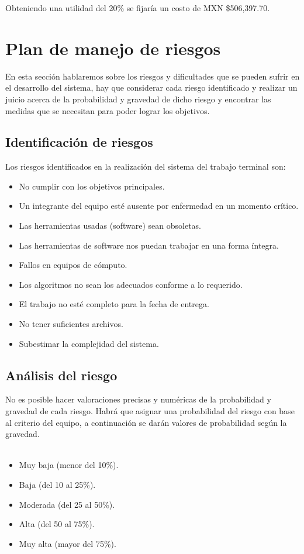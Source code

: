 \documentclass[12pt]{report}
\begin{document}
Obteniendo una utilidad del 20\% se fijaría un costo de MXN \$506,397.70.


\section{Plan de manejo de riesgos}
En esta sección hablaremos sobre los riesgos y dificultades que se pueden sufrir en el desarrollo del sistema, hay que considerar cada riesgo identificado y realizar un juicio acerca de la probabilidad y gravedad de dicho riesgo y encontrar las medidas que se necesitan para poder lograr los objetivos.\\

\subsection{Identificación de riesgos}
Los riesgos identificados en la realización del sistema del trabajo terminal son:
\begin{itemize}
\item No cumplir con los objetivos principales.
\item Un integrante del equipo esté ausente por enfermedad en un momento crítico.
\item Las herramientas usadas (software) sean obsoletas.
\item Las herramientas de software nos puedan trabajar en una forma íntegra.
\item Fallos en equipos de cómputo.
\item Los algoritmos no sean los adecuados conforme a lo requerido.
\item El trabajo no esté completo para la fecha de entrega.
\item No tener suficientes archivos.
\item Subestimar la complejidad del sistema.
\end{itemize}

\subsection{Análisis del riesgo}
No es posible hacer valoraciones precisas y numéricas de la probabilidad y gravedad de cada riesgo. Habrá que asignar una probabilidad del riesgo con base al criterio del equipo, a continuación se darán valores de probabilidad según la gravedad.\\\\
\begin{itemize}
\item Muy baja (menor del 10\%).
\item Baja (del 10 al 25\%).
\item Moderada (del 25 al 50\%).
\item Alta (del 50 al 75\%).
\item Muy alta (mayor del 75\%).
\end{itemize}
\end{document}
